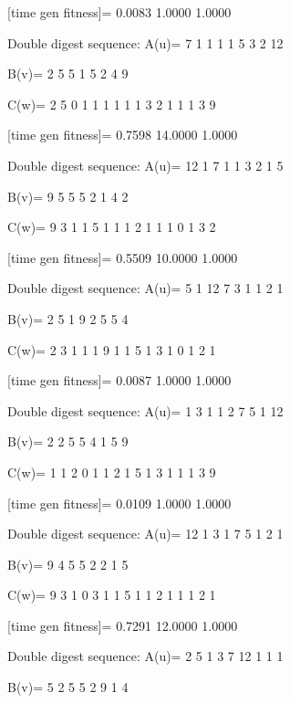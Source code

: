 [time gen fitness]=
    0.0083    1.0000    1.0000

Double digest sequence:
A(u)=
     7     1     1     1     1     5     3     2    12

B(v)=
     2     5     5     1     5     2     4     9

C(w)=
     2     5     0     1     1     1     1     1     1     3     2     1     1     1     3     9

[time gen fitness]=
    0.7598   14.0000    1.0000

Double digest sequence:
A(u)=
    12     1     7     1     1     3     2     1     5

B(v)=
     9     5     5     5     2     1     4     2

C(w)=
     9     3     1     1     5     1     1     1     2     1     1     1     0     1     3     2

[time gen fitness]=
    0.5509   10.0000    1.0000

Double digest sequence:
A(u)=
     5     1    12     7     3     1     1     2     1

B(v)=
     2     5     1     9     2     5     5     4

C(w)=
     2     3     1     1     1     9     1     1     5     1     3     1     0     1     2     1

[time gen fitness]=
    0.0087    1.0000    1.0000

Double digest sequence:
A(u)=
     1     3     1     1     2     7     5     1    12

B(v)=
     2     2     5     5     4     1     5     9

C(w)=
     1     1     2     0     1     1     2     1     5     1     3     1     1     1     3     9

[time gen fitness]=
    0.0109    1.0000    1.0000

Double digest sequence:
A(u)=
    12     1     3     1     7     5     1     2     1

B(v)=
     9     4     5     5     2     2     1     5

C(w)=
     9     3     1     0     3     1     1     5     1     1     2     1     1     1     2     1

[time gen fitness]=
    0.7291   12.0000    1.0000

Double digest sequence:
A(u)=
     2     5     1     3     7    12     1     1     1

B(v)=
     5     2     5     5     2     9     1     4

